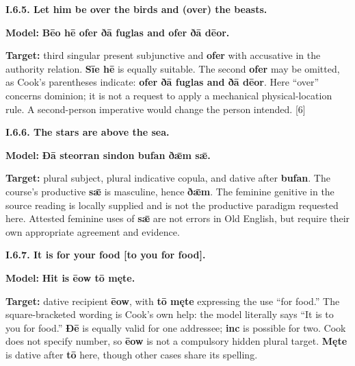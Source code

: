 \par\begin{minipage}{\linewidth}\raggedright
\textbf{I.6.5. Let him be over the birds and (over) the beasts.}

\textbf{Model:} \textbf{Bēo hē ofer ðā fuglas and ofer ðā dēor.}

\textbf{Target:} third singular present subjunctive and \textbf{ofer} with accusative in the authority relation. \textbf{Sīe hē} is equally suitable. The second \textbf{ofer} may be omitted, as Cook’s parentheses indicate: \textbf{ofer ðā fuglas and ðā dēor}. Here “over” concerns dominion; it is not a request to apply a mechanical physical-location rule. A second-person imperative would change the person intended. [6]

\end{minipage}\par\addvspace{4pt}

\par\begin{minipage}{\linewidth}\raggedright
\textbf{I.6.6. The stars are above the sea.}

\textbf{Model:} \textbf{Ðā steorran sindon bufan ðǣm sǣ.}

\textbf{Target:} plural subject, plural indicative copula, and dative after \textbf{bufan}. The course’s productive \textbf{sǣ} is masculine, hence \textbf{ðǣm}. The feminine genitive in the source reading is locally supplied and is not the productive paradigm requested here. Attested feminine uses of \textbf{sǣ} are not errors in Old English, but require their own appropriate agreement and evidence.

\end{minipage}\par\addvspace{4pt}

\par\begin{minipage}{\linewidth}\raggedright
\textbf{I.6.7. It is for your food [to you for food].}

\textbf{Model:} \textbf{Hit is ēow tō męte.}

\textbf{Target:} dative recipient \textbf{ēow}, with \textbf{tō męte} expressing the use “for food.” The square-bracketed wording is Cook’s own help: the model literally says “It is to you for food.” \textbf{Ðē} is equally valid for one addressee; \textbf{inc} is possible for two. Cook does not specify number, so \textbf{ēow} is not a compulsory hidden plural target. \textbf{Męte} is dative after \textbf{tō} here, though other cases share its spelling.

\end{minipage}\par\addvspace{4pt}

